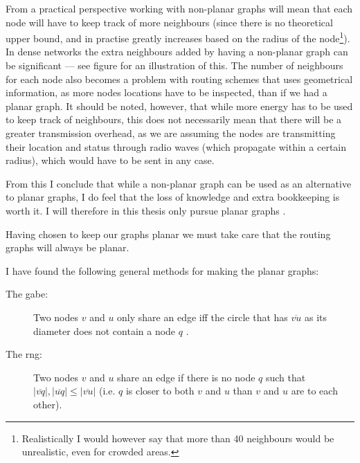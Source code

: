 From a practical perspective working with non-planar graphs will mean that each node will have to keep track of more neighbours (since there is no theoretical upper bound, and in practise greatly increases based on the radius of the node\footnote{Realistically I would however say that more than 40 neighbours would be unrealistic, even for crowded areas.}). In dense networks the extra neighbours added by having a non-planar graph can be significant --- see figure  for an illustration of this. The number of neighbours for each node also becomes a problem with routing schemes that uses geometrical information, as more nodes locations have to be inspected, than if we had a planar graph. It should be noted, however, that while more energy has to be used to keep track of neighbours, this does not necessarily mean that there will be a greater transmission overhead, as we are assuming the nodes are transmitting their location and status through radio waves (which propagate within a certain radius), which would have to be sent in any case.

From this I conclude that while a non-planar graph can be used as an alternative to planar graphs, I do feel that the loss of knowledge and extra bookkeeping is worth it. I will therefore in this thesis only pursue planar graphs .
 
Having chosen to keep our graphs planar we must take care that the routing graphs will always be planar.

I have found the following general methods for making the planar graphs:
\begin{description}
\item[The \ac{gabe}:] Two nodes $v$ and $u$ only share an edge iff the circle that has $\overline{vu}$ as its diameter does not contain a node $q$ \cite{gopher, gpsr}. 
\item[The \ac{rng}:] Two nodes $v$ and $u$ share an edge if there is no node $q$ such that $|\overline{vq}|, |\overline{uq}| \leq |\overline{vu}|$ (i.e. $q$ is closer to both $v$ and $u$ than $v$ and $u$ are to each other). \cite{gpsr, RNG}
\end{description}

